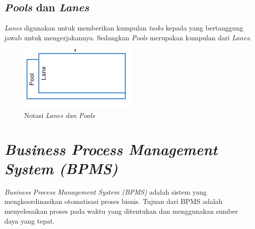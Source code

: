 \subsection{\textit{Pools} dan \textit{Lanes}}
\label{sec:poolslanes}
\textit{Lanes} digunakan untuk memberikan kumpulan \textit{tasks} kepada yang bertanggung jawab untuk mengerjakannya. Sedangkan \textit{Pools} merupakan kumpulan dari \textit{Lanes}.
\begin{figure}[H]
	\centering
	\includegraphics[scale=1]{Gambar/Bab-2/bpmn/swimlane}
	\caption{Notasi \textit{Lanes dan Pools}} 
	\label{lanespools}
\end{figure}


 

\section{\textit{Business Process Management System (BPMS)}}
\textit{Business Process Management System (BPMS)} adalah sistem yang mengkoordinasikan otomatisasi proses bisnis. Tujuan dari BPMS adalah menyelesaikan proses pada waktu yang ditentukan dan menggunakan sumber daya yang tepat. 

